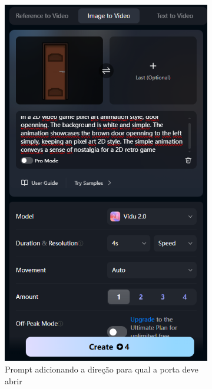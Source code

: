 \begin{figure}[htbp]
\begin{subfigure}{0.35\linewidth}
        \includegraphics[width=1\linewidth]{figs/vidu/tela16.PNG}
        \caption{\small Prompt adicionando a direção para qual a porta deve abrir}
        \label{fig:vidu15c}
    \end{subfigure}
    \begin{subfigure}{0.35\linewidth}

\end{subfigure}
\end{figure}
